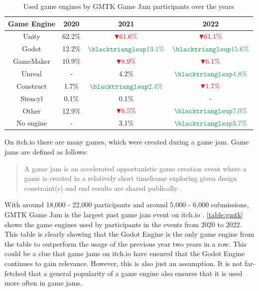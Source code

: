\begin{table}[h!]
    \centering
    \begin{tabular}{|c c c c|}
        \hline
        Game Engine & 2020   & 2021                                               & 2022                                               \\
        \hline\hline
        Unity       & 62.2\% & $\textcolor{red}{\blacktriangledown 61.6\%}$       & $\textcolor{red}{\blacktriangledown 61.1\%}$       \\
        Godot       & 12.2\% & $\textcolor{ForestGreen}{\blacktriangleup 13.1\%}$ & $\textcolor{ForestGreen}{\blacktriangleup 15.6\%}$ \\
        GameMaker   & 10.9\% & $\textcolor{red}{\blacktriangledown 8.9\% }$       & $\textcolor{red}{\blacktriangledown 6.1\%}$        \\
        Unreal      & -      & 4.2\%                                              & $\textcolor{ForestGreen}{\blacktriangleup 4.8\%}$  \\
        Construct   & 1.7\%  & $\textcolor{ForestGreen}{\blacktriangleup 2.4\%}$  & $\textcolor{red}{\blacktriangledown 1.7\%}$        \\
        Stencyl     & 0.1\%  & 0.1\%                                              & -                                                  \\
        Other       & 12.9\% & $\textcolor{red}{\blacktriangledown 6.5\%}$        & $\textcolor{ForestGreen}{\blacktriangleup 7.0\%}$  \\
        No engine   & -      & 3.1\%                                              & $\textcolor{ForestGreen}{\blacktriangleup 3.7\%}$  \\
        \hline
    \end{tabular}
    \caption{Used game engines by GMTK Game Jam participants over the years \cite{gmtk-twitter}}
    \label{table:gmtk}
\end{table}

On itch.io there are many games, which were created during a game jam.
Game jams are defined as follows:
\blockquote{A game jam is an accelerated opportunistic game creation event where a game is created in a relatively short timeframe exploring given design constraint(s) and end results are shared publically \cite{game-jam-definition}.}
With around 18,000 - 22,000 participants and around 5,000 - 6,000 submissions, GMTK Game Jam is the largest past game jam event on itch.io \cite{itch-past-jams}.
\autoref{table:gmtk} shows the game engines used by participants in the events from 2020 to 2022.
This table is clearly showing that the Godot Engine is the only game engine from the table to outperform the usage of the previous year two years in a row.
This could be a clue that game jams on itch.io have ensured that the Godot Engine continues to gain relevance.
However, this is also just an assumption.
It is not far-fetched that a general popularity of a game engine also ensures that it is used more often in game jams.\\

